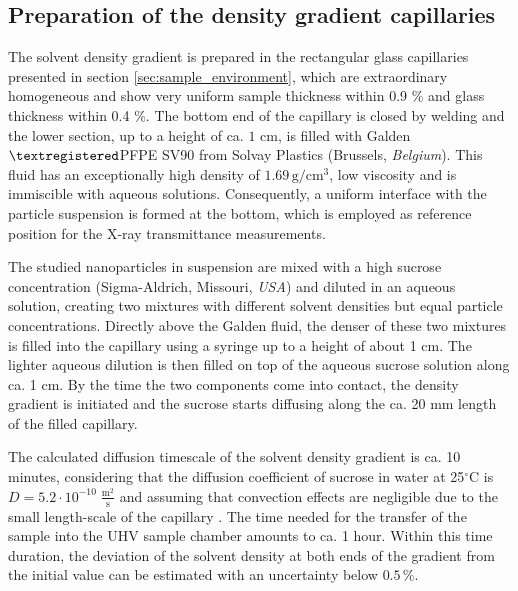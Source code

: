 \subsection{Preparation of the density gradient capillaries}
\label{sec:GradientPreparation}
The solvent density gradient is prepared in the rectangular glass capillaries presented in section \ref{sec:sample_environment}, which are extraordinary homogeneous and show very uniform sample thickness within 0.9 $\%$ and glass thickness within 0.4 $\%$. The bottom end of the capillary is closed by welding and the lower section, up to a height of ca. \(1\) cm, is filled with Galden\(\textregistered\)PFPE SV90 from Solvay Plastics (Brussels, \emph{Belgium}). This fluid has an exceptionally high density of $1.69\,\mathrm{g/cm^3}$, low viscosity and is immiscible with aqueous solutions. Consequently, a uniform interface with the particle suspension is formed at the bottom, which is employed as reference position for the X-ray transmittance measurements. 

The studied nanoparticles in suspension are mixed with a high sucrose concentration (Sigma-Aldrich, Missouri, \emph{USA}) and diluted in an aqueous solution, creating two mixtures with different solvent densities but equal particle concentrations. Directly above the Galden fluid, the denser of these two mixtures is filled into the capillary using a syringe up to a height of about 1 cm. The lighter aqueous dilution is then filled on top of the aqueous sucrose solution along ca. 1 cm. By the time the two components come into contact, the density gradient is initiated and the sucrose starts diffusing along the ca. 20 mm length of the filled capillary.

The calculated diffusion timescale of the solvent density gradient is ca. 10 minutes, considering that the diffusion coefficient of sucrose in water at 25$^{\circ}$C is \(D=5.2 \cdot 10^{-10} \;\frac{\mbox{m}^2}{\mbox{s}}\) \citep{uedaira_sugar-water_1985,ribeiro_binary_2006} and assuming that convection effects are negligible due to the small length-scale of the capillary \citep{berberan-santos_barometric_1997}. The time needed for the transfer of the sample into the UHV sample chamber amounts to ca. 1 hour. Within this time duration, the deviation of the solvent density at both ends of the gradient from the initial value can be estimated with an uncertainty below \(0.5\,\%\). 



